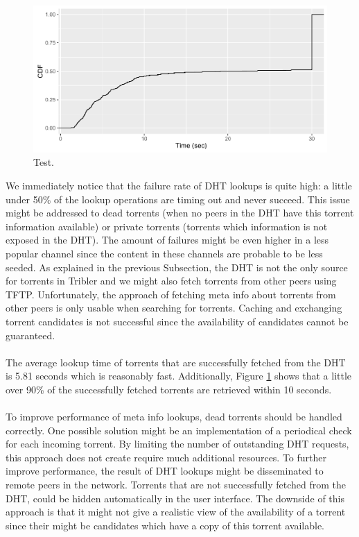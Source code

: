 \begin{figure}[!h]
	\centering
	\includegraphics[width=1.0\columnwidth]{images/experiments/metainfo_fetch}
	\caption{Test.}
	\label{fig:metainfo_fetch}
\end{figure}

We immediately notice that the failure rate of DHT lookups is quite high: a little under 50\% of the lookup operations are timing out and never succeed. This issue might be addressed to dead torrents (when no peers in the DHT have this torrent information available) or private torrents (torrents which information is not exposed in the DHT). The amount of failures might be even higher in a less popular channel since the content in these channels are probable to be less seeded. As explained in the previous Subsection, the DHT is not the only source for torrents in Tribler and we might also fetch torrents from other peers using TFTP. Unfortunately, the approach of fetching meta info about torrents from other peers is only usable when searching for torrents. Caching and exchanging torrent candidates is not successful since the availability of candidates cannot be guaranteed.\\\\
The average lookup time of torrents that are successfully fetched from the DHT is 5.81 seconds which is reasonably fast. Additionally, Figure \ref{fig:metainfo_fetch} shows that a little over 90\% of the successfully fetched torrents are retrieved within 10 seconds.\\\\
To improve performance of meta info lookups, dead torrents should be handled correctly. One possible solution might be an implementation of a periodical check for each incoming torrent. By limiting the number of outstanding DHT requests, this approach does not create require much additional resources. To further improve performance, the result of DHT lookups might be disseminated to remote peers in the network. Torrents that are not successfully fetched from the DHT, could be hidden automatically in the user interface. The downside of this approach is that it might not give a realistic view of the availability of a torrent since their might be candidates which have a copy of this torrent available.